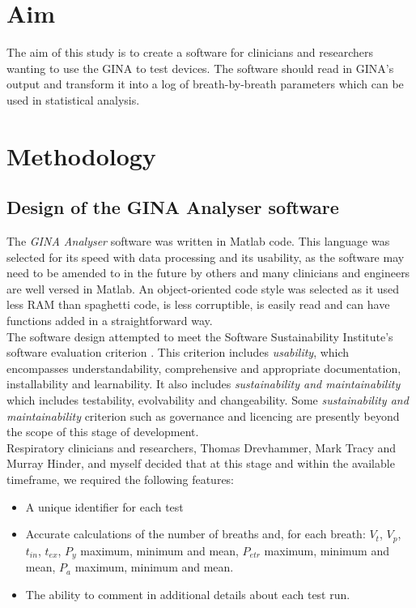 \documentclass[12pt, openany, oneside]{book}
\begin{document}
\section{Aim}
The aim of this study is to create a software for clinicians and researchers wanting to use the GINA to test devices. The software should read in GINA's output and transform it into a log of breath-by-breath parameters which can be used in statistical analysis.
\section{Methodology}
\subsection{Design of the GINA Analyser software}
The \textit{GINA Analyser} software was written in Matlab code. This language was selected for its speed with data processing and its usability, as the software may need to be amended to in the future by others and many clinicians and engineers are well versed in Matlab. An object-oriented code style was selected as it used less RAM than spaghetti code, is less corruptible, is easily read and can have functions added in a straightforward way. \\

The software design attempted to meet the Software Sustainability Institute's software evaluation criterion \citep{soft}. This criterion includes \textit{usability}, which encompasses understandability, comprehensive and appropriate documentation, installability and learnability. It also includes \textit{sustainability and maintainability} which includes testability, evolvability and changeability. Some \textit{sustainability and maintainability} criterion such as governance and licencing are presently beyond the scope of this stage of development.\\

Respiratory clinicians and researchers, Thomas Drevhammer, Mark Tracy and Murray Hinder, and myself decided that at this stage and within the available timeframe, we required the following features:
\begin{itemize}
\item A unique identifier for each test
\item Accurate calculations of the number of breaths and, for each breath: $V_t$, $V_p$, $t_{in}$, $t_{ex}$, $P_y$ maximum, minimum and mean, $P_{etr}$ maximum, minimum and mean, $P_a$ maximum, minimum and mean.
\item The ability to comment in additional details about each test run.
\end{itemize}
\end{document}
